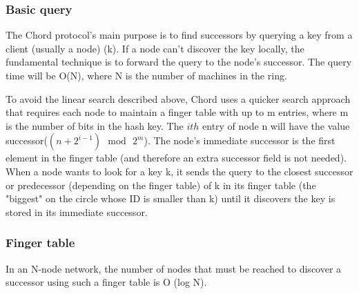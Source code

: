 \documentclass[acmlarge]{acmart}
\begin{document}
\subsubsection{Basic query}
The Chord protocol's main purpose is to find successors by querying a key from a client (usually a node) (k). If a node can't discover the key locally, the fundamental technique is to forward the query to the node's successor. The query time will be O(N), where N is the number of machines in the ring.

To avoid the linear search described above, Chord uses a quicker search approach that requires each node to maintain a finger table with up to m entries, where m is the number of bits in the hash key. The $ith$ entry of node n will have the value successor($(n+2^{i-1})\,\bmod\,2^m$). The node's immediate successor is the first element in the finger table (and therefore an extra successor field is not needed). When a node wants to look for a key k, it sends the query to the closest successor or predecessor (depending on the finger table) of k in its finger table (the "biggest" on the circle whose ID is smaller than k) until it discovers the key is stored in its immediate successor.
\subsubsection{Finger table}
In an N-node network, the number of nodes that must be reached to discover a successor using such a finger table is O (log N).
\end{document}
